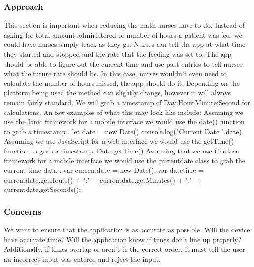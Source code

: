 \documentclass[onecolumn, draftclsnofoot,10pt, compsoc]{IEEEtran}
\begin{document}
\subsubsection{Approach}
This section is important when reducing the math nurses have to do. Instead of asking for total amount administered or number of hours a patient was fed, we could have nurses simply track as they go. Nurses can tell the app at what time they started and stopped and the rate that the feeding was set to. The app should be able to figure out the current time and use past entries to tell nurses what the future rate should be. In this case, nurses wouldn't even need to calculate the number of hours missed, the app should do it. Depending on the platform being used the method can slightly change, however it will always remain fairly standard. We will grab a timestamp of Day:Hour:Minute:Second for calculations. 
\newline
\newline
An few examples of what this may look like include: 
\newline
\newline
Assuming we use the Ionic framework for a mobile interface we would use the date() function to grab a timestamp \autocite{ionicforum}.
\newline
\indent let date = new Date()\newline
\indent console.log("Current Date ",date)
\newline
\newline
Assuming we use JavaScript for a web interface we would use the getTime() function to grab a timestamp.
\newline
\indent Date.getTime()
\newline
\newline
Assuming that we use Cordova framework for a mobile interface we would use the currentdate class to grab the current time data \autocite{cordova}.
\newline
\indent var currentdate = new Date(); \newline
\indent var datetime = currentdate.getHours() + ":"\newline
\indent \indent \indent + currentdate.getMinutes() + ":" \newline
\indent \indent \indent + currentdate.getSeconds();\newline
\subsubsection{Concerns}
We want to ensure that the application is as accurate as possible. Will the device have accurate time? Will the application know if times don't line up properly? Additionally, if times overlap or aren't in the correct order, it must tell the user an incorrect input was entered and reject the input.
\end{document}
